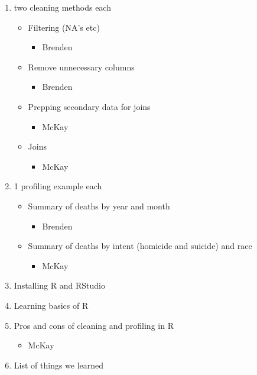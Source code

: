 \documentclass[]{article}
\providecommand{\tightlist}{%
  \setlength{\itemsep}{0pt}\setlength{\parskip}{0pt}}
\begin{document}
\begin{enumerate}
\def\labelenumi{\arabic{enumi}.}
\tightlist
\item
  two cleaning methods each

  \begin{itemize}
  \tightlist
  \item
    Filtering (NA's etc)

    \begin{itemize}
    \tightlist
    \item
      Brenden
    \end{itemize}
  \item
    Remove unnecessary columns

    \begin{itemize}
    \tightlist
    \item
      Brenden
    \end{itemize}
  \item
    Prepping secondary data for joins

    \begin{itemize}
    \tightlist
    \item
      McKay
    \end{itemize}
  \item
    Joins

    \begin{itemize}
    \tightlist
    \item
      McKay
    \end{itemize}
  \end{itemize}
\item
  1 profiling example each

  \begin{itemize}
  \tightlist
  \item
    Summary of deaths by year and month

    \begin{itemize}
    \tightlist
    \item
      Brenden
    \end{itemize}
  \item
    Summary of deaths by intent (homicide and suicide) and race

    \begin{itemize}
    \tightlist
    \item
      McKay
    \end{itemize}
  \end{itemize}
\item
  Installing R and RStudio
\item
  Learning basics of R
\item
  Pros and cons of cleaning and profiling in R

  \begin{itemize}
  \tightlist
  \item
    McKay
  \end{itemize}
\item
  List of things we learned
\end{enumerate}
\end{document}
